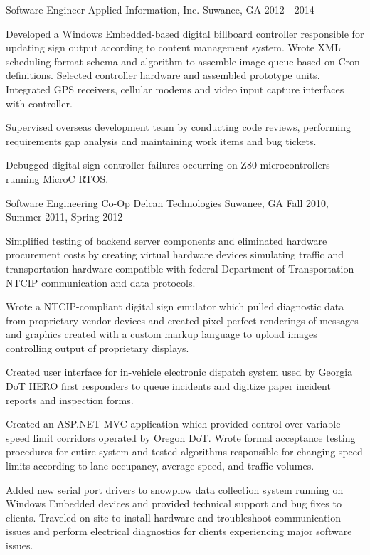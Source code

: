 \begin{cventries}
  \cventry
    {Software Engineer} %
    {Applied Information, Inc.} %
    {Suwanee, GA} %
    {2012 - 2014} %
    {
      \begin{cvitems} %
        \item {Developed a Windows Embedded-based digital billboard controller responsible for updating sign output according to content management system. Wrote XML scheduling format schema and algorithm to assemble image queue based on Cron definitions. Selected controller hardware and assembled prototype units. Integrated GPS receivers, cellular modems and video input capture interfaces with controller.}
		\item {Supervised overseas development team by conducting code reviews, performing requirements gap analysis and maintaining work items and bug tickets.}
		\item {Debugged digital sign controller failures occurring on Z80 microcontrollers running MicroC RTOS.}
      \end{cvitems}
    }

  \cventry
    {Software Engineering Co-Op} %
    {Delcan Technologies} %
    {Suwanee, GA} %
    {Fall 2010, Summer 2011, Spring 2012} %
    {
      \begin{cvitems} %
        \item {Simplified testing of backend server components and eliminated hardware procurement costs by creating virtual hardware devices simulating traffic and transportation hardware compatible with federal Department of Transportation NTCIP communication and data protocols.}
        \item {Wrote a NTCIP-compliant digital sign emulator which pulled diagnostic data from proprietary vendor devices and created pixel-perfect renderings of messages and graphics created with a custom markup language to upload images controlling output of proprietary displays.}
		\item {Created user interface for in-vehicle electronic dispatch system used by Georgia DoT HERO first responders to queue incidents and digitize paper incident reports and inspection forms.}
		\item {Created an ASP.NET MVC application which provided control over variable speed limit corridors operated by Oregon DoT. Wrote formal acceptance testing procedures for entire system and tested algorithms responsible for changing speed limits according to lane occupancy, average speed, and traffic volumes.}
		\item {Added new serial port drivers to snowplow data collection system running on Windows Embedded devices and provided technical support and bug fixes to clients. Traveled on-site to install hardware and troubleshoot communication issues and perform electrical diagnostics for clients experiencing major software issues.}
      \end{cvitems}
    }

\end{cventries}
